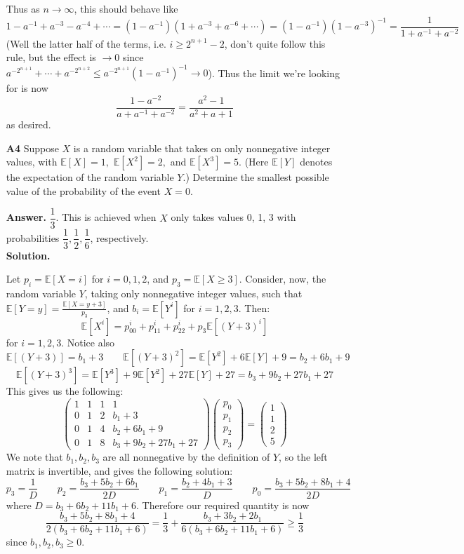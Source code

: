 \documentclass[11pt,a4paper]{article}
\newcommand{\bbE}{\mathbb E}
\newcommand{\<}{\langle}
\renewcommand{\>}{\rangle}
\begin{document}
\begin{enumerate}
\begin{itemize}
	\end{itemize}
    Thus as $n\to\infty$, this should behave like 
    \[
    1-a^{-1}+a^{-3}-a^{-4}+\cdots 
    =(1-a^{-1})(1+a^{-3}+a^{-6}+\cdots)
    =(1-a^{-1})(1-a^{-3})^{-1}
    =\frac{1}{1+a^{-1}+a^{-2}}
    \]
    (Well the latter half of the terms, i.e. $i\ge 2^{n+1}-2$, don't quite follow this rule, but the effect is $\to 0$ since $a^{-2^{n+1}}+\cdots + a^{-2^{n+2}}\le a^{-2^{n+1}}(1-a^{-1})^{-1}\to 0$). 
    Thus the limit we're looking for is now 
    \[
    \frac{1-a^{-2}}{a+a^{-1}+a^{-2}}=\frac{a^2-1}{a^2+a+1}
    \]
    as desired. 
	
	\item[\textbf{A4}] Suppose $X$ is a random variable that takes on only nonnegative integer values, with $\bbE[X]=1,$ $\bbE[X^2]=2,$ and $\bbE[X^3]=5.$ (Here $\bbE[Y]$ denotes the expectation of the random variable $Y.$) Determine the smallest possible value of the probability of the event $X=0.$
	
	\textbf{Answer.} $\dfrac 13$. This is achieved when $X$ only takes values 0, 1, 3 with probabilities $\dfrac 13, \dfrac 12, \dfrac 16$, respectively. \\
	\textbf{Solution.} 
	
	Let $p_i = \bbE[X=i]$ for $i=0, 1, 2$, and $p_3 = \bbE[X\ge 3]$. 
	Consider, now, the random variable $Y$, taking only nonnegative integer values, 
	such that $\bbE[Y=y]=\frac{\bbE[X=y + 3]}{p_3}$, 
	and $b_i = \bbE[Y^i]$ for $i=1, 2, 3$. 
	Then: 
	\[
	\bbE[X^i] = p_00^i + p_11^i + p_22^i + p_3\bbE[(Y+3)^i]
	\]
	for $i=1, 2, 3$. 
	Notice also 
	\[
	\bbE[(Y+3)]=b_1+3
	\qquad 
	\bbE[(Y+3)^2]
	=\bbE[Y^2]+6\bbE[Y]+9
	=b_2+6b_1+9
	\]
	\[
	\bbE[(Y+3)^3]
	=\bbE[Y^3]+9\bbE[Y^2]+27\bbE[Y]+27
	=b_3+9b_2+27b_1+27
	\]
	This gives us the following: 
	\[
	\begin{pmatrix}
		1 & 1 & 1 & 1\\
		0 & 1 & 2 & b_1+3\\
		0 & 1 & 4 & b_2+6b_1+9\\
		0 & 1 & 8 & b_3+9b_2+27b_1+27
	\end{pmatrix}
    \begin{pmatrix}
    	p_0 \\ p_1 \\ p_2 \\ p_3
    \end{pmatrix}
    =
    \begin{pmatrix}
    	1 \\ 1 \\ 2 \\ 5
    \end{pmatrix}
	\]
	We note that $b_1, b_2, b_3$ are all nonnegative by the definition of $Y$, 
	so the left matrix is invertible, and gives the following solution: 
	\[
	p_3 = \frac{1}{D}
	\qquad 
	p_2 = \frac{b_3+5b_2+6b_1}{2D}
	\qquad 
	p_1 = \frac{b_2+4b_1+3}{D}
	\qquad 
	p_0 = \frac{b_3 + 5b_2 + 8b_1+4}{2D}
	\]
	where $D=b_3+6b_2+11b_1+6$. 
	Therefore our required quantity is now 
	\[
	\frac{b_3 + 5b_2 + 8b_1+4}{2(b_3+6b_2+11b_1+6)}
	=\frac 13 + \frac{b_3+3b_2+2b_1}{6(b_3+6b_2+11b_1+6)}
	\ge \frac 13
	\]
	since $b_1, b_2, b_3\ge 0$. 
	

\end{enumerate}
\end{document}
